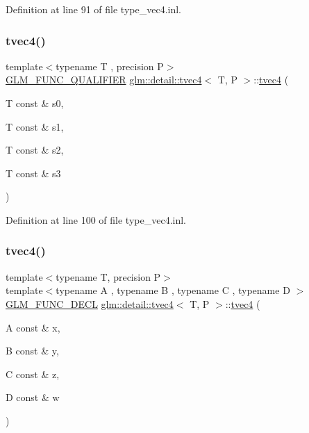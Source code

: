 Definition at line 91 of file type\+\_\+vec4.\+inl.

\mbox{\label{structglm_1_1detail_1_1tvec4_a7b81815685a8d9e0fbdd9b660750ef26}} 
\subsubsection{\texorpdfstring{tvec4()}{tvec4()}\hspace{0.1cm}{\footnotesize\ttfamily [6/23]}}
{\footnotesize\ttfamily template$<$typename T , precision P$>$ \\
\hyperlink{setup_8hpp_a33fdea6f91c5f834105f7415e2a64407}{G\+L\+M\+\_\+\+F\+U\+N\+C\+\_\+\+Q\+U\+A\+L\+I\+F\+I\+ER} \hyperlink{structglm_1_1detail_1_1tvec4}{glm\+::detail\+::tvec4}$<$ T, P $>$\+::\hyperlink{structglm_1_1detail_1_1tvec4}{tvec4} (\begin{DoxyParamCaption}\item[{T const \&}]{s0,  }\item[{T const \&}]{s1,  }\item[{T const \&}]{s2,  }\item[{T const \&}]{s3 }\end{DoxyParamCaption})}



Definition at line 100 of file type\+\_\+vec4.\+inl.

\mbox{\label{structglm_1_1detail_1_1tvec4_aa19075717a5439da09d279cc4b2b9a73}} 
\subsubsection{\texorpdfstring{tvec4()}{tvec4()}\hspace{0.1cm}{\footnotesize\ttfamily [7/23]}}
{\footnotesize\ttfamily template$<$typename T, precision P$>$ \\
template$<$typename A , typename B , typename C , typename D $>$ \\
\hyperlink{setup_8hpp_ab2d052de21a70539923e9bcbf6e83a51}{G\+L\+M\+\_\+\+F\+U\+N\+C\+\_\+\+D\+E\+CL} \hyperlink{structglm_1_1detail_1_1tvec4}{glm\+::detail\+::tvec4}$<$ T, P $>$\+::\hyperlink{structglm_1_1detail_1_1tvec4}{tvec4} (\begin{DoxyParamCaption}\item[{A const \&}]{x,  }\item[{B const \&}]{y,  }\item[{C const \&}]{z,  }\item[{D const \&}]{w }\end{DoxyParamCaption})}



